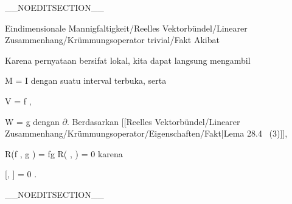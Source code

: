 __NOEDITSECTION__

{Eindimensionale Mannigfaltigkeit/Reelles Vektorbündel/Linearer Zusammenhang/Krümmungsoperator trivial/Fakt}
{Akibat}
{}
{

\faktzusatz {}
\faktzusatz {}

}
{

Karena pernyataan bersifat lokal, kita dapat langsung mengambil

\mavergleichskette
{\vergleichskette
{ M
}
{ = }{ I
}
{  }{
}
{    }{
}
{   }{
}
}
{}{}{}
dengan suatu interval terbuka, serta

\mavergleichskette
{\vergleichskette
{ V
}
{ = }{ f \partial
}
{  }{
}
{    }{
}
{   }{
}
}
{}{}{,}

\mavergleichskette
{\vergleichskette
{ W
}
{ = }{ g \partial
}
{  }{
}
{    }{
}
{   }{
}
}
{}{}{}
dengan
$\partial$. Berdasarkan
[[Reelles Vektorbündel/Linearer Zusammenhang/Krümmungsoperator/Eigenschaften/Fakt|Lema 28.4  (3)]],

\mavergleichskettedisp
{\vergleichskette
{ R(f \partial, g \partial)
}
{ =} { fg R( \partial, \partial)
}
{ =} { 0
}
{ } {
}
{ } {
}
}
{}{}{}
karena

\mavergleichskette
{\vergleichskette
{ [\partial, \partial ]
}
{ = }{ 0
}
{  }{
}
{    }{
}
{   }{
}
}
{}{}{.}

}

__NOEDITSECTION__

